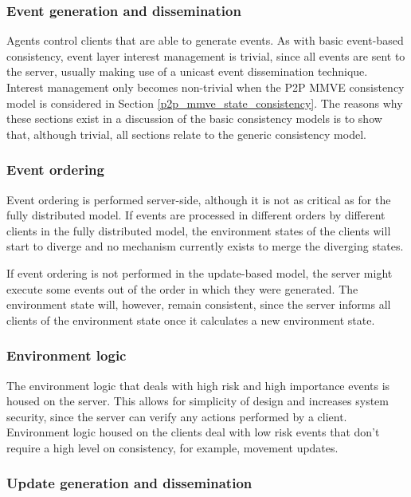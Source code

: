 \subsubsection{Event generation and dissemination}
Agents control clients that are able to generate events. As with basic event-based consistency, event layer interest management is trivial, since all events are sent to the server, usually making use of a unicast event dissemination technique. Interest management only becomes non-trivial when the P2P MMVE consistency model is considered in Section \ref{p2p_mmve_state_consistency}. The reasons why these sections exist in a discussion of the basic consistency models is to show that, although trivial, all sections relate to the generic consistency model.

\subsubsection{Event ordering}
\label{cs_event_ordering}

Event ordering is performed server-side, although it is not as critical as for the fully distributed model. If events are processed in different orders by different clients in the fully distributed model, the environment states of the clients will start to diverge and no mechanism currently exists to merge the diverging states.

If event ordering is not performed in the update-based model, the server might execute some events out of the order in which they were generated. The environment state will, however, remain consistent, since the server informs all clients of the environment state once it calculates a new environment state.

\subsubsection{Environment logic}
The environment logic that deals with high risk and high importance events is housed on the server. This allows for simplicity of design and increases system security, since the server can verify any actions performed by a client. Environment logic housed on the clients deal with low risk events that don't require a high level on consistency, for example, movement updates.

\subsubsection{Update generation and dissemination}

